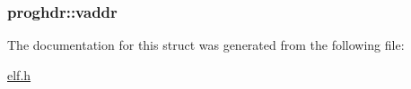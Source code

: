 \subsubsection[{\texorpdfstring{vaddr}{vaddr}}]{ proghdr\+::vaddr}\hypertarget{structproghdr_a6fa1051e19935bbedc5eaf086f5330b4}{}\label{structproghdr_a6fa1051e19935bbedc5eaf086f5330b4}


The documentation for this struct was generated from the following file\+:\begin{DoxyCompactItemize}
\item 
\hyperlink{elf_8h}{elf.\+h}\end{DoxyCompactItemize}
